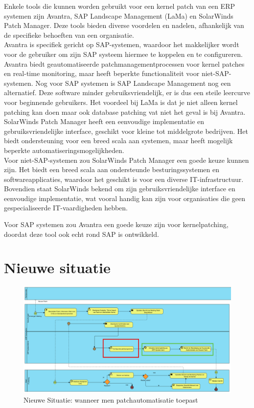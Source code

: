 Enkele tools die kunnen worden gebruikt voor een kernel patch van een ERP systemen zijn Avantra, SAP Landscape Management (LaMa) en SolarWinds Patch Manager. Deze tools bieden diverse voordelen en nadelen, afhankelijk van de specifieke behoeften van een organisatie. \\
 Avantra is specifiek gericht op SAP-systemen, waardoor het makkelijker wordt voor de gebruiker om zijn SAP systeem hiermee te koppelen en te configureren. Avantra biedt geautomatiseerde patchmanagementprocessen voor kernel patches en real-time monitoring, maar heeft 
  beperkte functionaliteit voor niet-SAP-systemen. Nog voor SAP systemen is SAP Landscape Management nog een alternatief. Deze software minder gebruiksvriendelijk, er is dus een steile leercurve voor beginnende gebruikers. Het voordeel 
 bij LaMa is dat je niet alleen kernel patching kan doen maar ook database patching vat niet het geval is bij Avantra. \\
 SolarWinds Patch Manager heeft een eenvoudige implementatie en gebruiksvriendelijke interface, geschikt voor kleine tot middelgrote bedrijven. Het biedt ondersteuning voor een breed scala aan 
 systemen, maar heeft mogelijk beperkte automatiseringsmogelijkheden. \\

 Voor niet-SAP-systemen zou SolarWinds Patch Manager een goede keuze kunnen zijn. Het biedt een breed scala aan ondersteunde besturingssystemen en softwareapplicaties, waardoor het geschikt is voor
  een diverse IT-infrastructuur. Bovendien staat SolarWinds bekend om zijn gebruiksvriendelijke interface en eenvoudige implementatie, wat vooral handig kan zijn voor organisaties die geen gespecialiseerde IT-vaardigheden hebben.
 
Voor SAP systemen zou Avantra een goede keuze zijn voor kernelpatching, doordat deze tool ook echt rond SAP is ontwikkeld. \\

\section{Nieuwe situatie}
\begin{figure}[h]
    \centering
    \includegraphics[width=\textwidth]{nieuwesituatie.png}
    \caption{Nieuwe Situatie: wanneer men patchautomatisatie toepast}
     \label{fig:nieuwesituatie}
\end{figure}
\newpage


